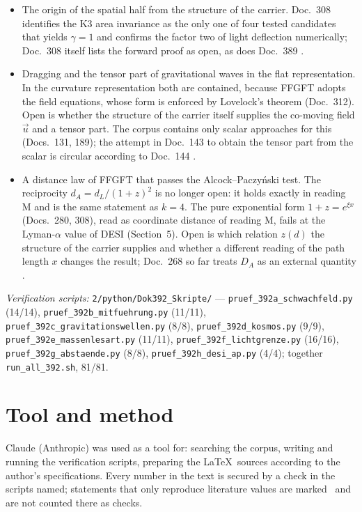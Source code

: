 \begin{itemize}[leftmargin=*,itemsep=1pt]
\item The origin of the spatial half from the structure of the carrier. Doc.~308 identifies the K3
area invariance as the only one of four tested candidates that yields $\gamma=1$ and confirms the
factor two of light deflection numerically; Doc.~308 itself lists the forward proof as open, as does
Doc.~389 \SM.
\item Dragging and the tensor part of gravitational waves in the flat representation. In the
curvature representation both are contained, because FFGFT adopts the field equations, whose form is
enforced by Lovelock's theorem (Doc.~312). Open is whether the structure of the carrier itself
supplies the co-moving field $\vec u$ and a tensor part. The corpus contains only scalar approaches
for this (Docs.~131, 189); the attempt in Doc.~143 to obtain the tensor part from the scalar is
circular according to Doc.~144 \SM.
\item A distance law of FFGFT that passes the Alcock--Paczyński test. The reciprocity
$d_A=d_L/(1+z)^2$ is no longer open: it holds exactly in reading M and is the same statement as $k=4$.
The pure exponential form $1+z=e^{\xi x}$ (Docs.~280, 308), read as coordinate distance of reading M,
fails at the Lyman-$\alpha$ value of DESI (Section~5). Open is which relation $z(d)$ the structure of
the carrier supplies and whether a different reading of the path length $x$ changes the result;
Doc.~268 so far treats $D_A$ as an external quantity \SM.
\end{itemize}

\vspace{1em}
\noindent\textit{Verification scripts:} \texttt{2/python/Dok392\_Skripte/} --- \texttt{pruef\_392a\_schwachfeld.py}
(14/14), \texttt{pruef\_392b\_mitfuehrung.py} (11/11), \texttt{pruef\_392c\_gravitationswellen.py} (8/8),
\texttt{pruef\_392d\_kosmos.py} (9/9), \texttt{pruef\_392e\_massenlesart.py} (11/11), \texttt{pruef\_392f\_lichtgrenze.py} (16/16), \texttt{pruef\_392g\_abstaende.py} (8/8),
\texttt{pruef\_392h\_desi\_ap.py} (4/4); together \texttt{run\_all\_392.sh}, 81/81.

\section*{Tool and method}

Claude (Anthropic) was used as a tool for: searching the corpus, writing and running the verification
scripts, preparing the \LaTeX\ sources according to the author's specifications. Every number in the
text is secured by a check in the scripts named; statements that only reproduce literature values are
marked \QM\ and are not counted there as checks.

